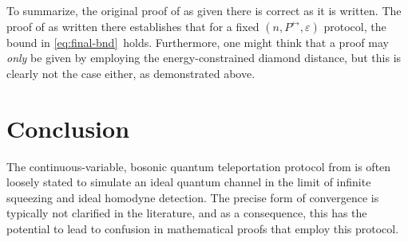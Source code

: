 \documentclass[apsrev,twocolumn]{revtex4-1}%
\begin{document}
To summarize, the original proof of \cite[Theorem~24]{WTB16} as given there is
correct as it is written. The proof of \cite[Theorem~24]{WTB16} as written
there establishes that for a fixed $(n,P^{\leftrightarrow},\varepsilon)$
protocol, the bound in \eqref{eq:final-bnd}\ holds.
Furthermore,
one might think that a proof may \textit{only} be given by employing the
energy-constrained diamond distance, but this is clearly not the case either,
as demonstrated above.

\section{Conclusion}

\label{sec:conclusion}

The continuous-variable, bosonic quantum teleportation protocol from
\cite{prl1998braunstein} is often loosely stated to simulate an ideal quantum
channel in the limit of infinite squeezing and ideal homodyne detection. The
precise form of convergence is typically not clarified in the literature, and
as a consequence, this has the potential to lead to confusion in mathematical
proofs that employ this protocol.
\end{document}

